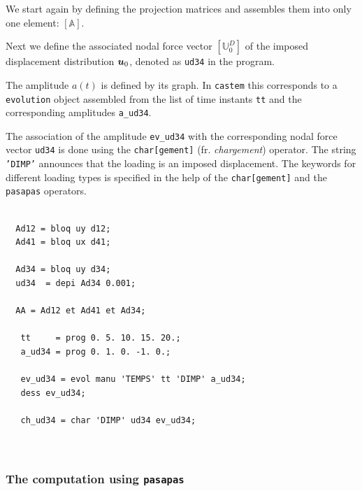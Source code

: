 \begin{castemcom}
We start again by defining the projection matrices and 
assembles them into only one element: $[\mathbb{A}]$. 

Next we define the associated nodal force vector 
$[\mathbb{U}_0^D]$ of the imposed displacement distribution 
$\bm{u}_0$, denoted as \texttt{ud34} in the program.  
 
The amplitude $a(t)$ is defined by its graph. In \texttt{castem}
this corresponds to a \texttt{evolution} object assembled from 
the list of time instants \texttt{tt} and the corresponding 
amplitudes \texttt{a\_ud34}.     

The association of the amplitude \texttt{ev\_ud34} with the 
corresponding nodal force vector \texttt{ud34} is done using 
the \texttt{char[gement]} (fr. \emph{chargement}) operator. The string 
\texttt{'DIMP'} announces that the loading is an 
imposed displacement. The keywords for different loading types
is specified in the help of the  \texttt{char[gement]}  
and the  \texttt{pasapas} operators.  

\end{castemcom}
\begin{castemlines}
\begin{verbatim}

  Ad12 = bloq uy d12;
  Ad41 = bloq ux d41;
  
  Ad34 = bloq uy d34;
  ud34  = depi Ad34 0.001;
  
  AA = Ad12 et Ad41 et Ad34;

   tt     = prog 0. 5. 10. 15. 20.;  
   a_ud34 = prog 0. 1. 0. -1. 0.;
   
   ev_ud34 = evol manu 'TEMPS' tt 'DIMP' a_ud34;
   dess ev_ud34;
   
   ch_ud34 = char 'DIMP' ud34 ev_ud34; 
 
 
\end{verbatim}
\end{castemlines}

\subsubsection*{The computation using \texttt{pasapas}}

